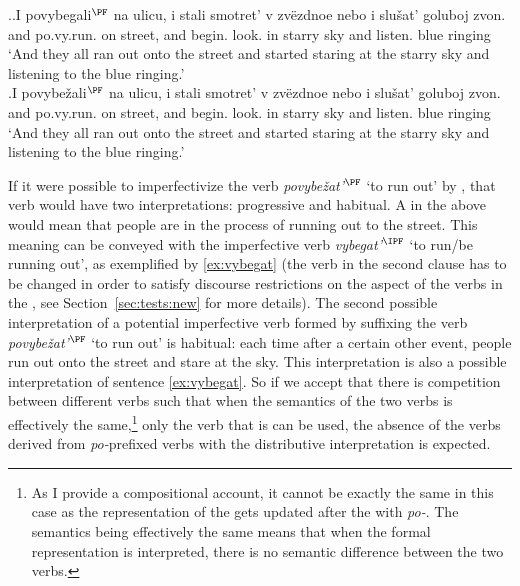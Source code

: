 \ex.\label{ex:povy}\ag.\label{ex:povybegat}I povybegali$^{\PF}$ na ulicu, i stali smotret' v zv\"{e}zdnoe nebo i slu\v{s}at' goluboj zvon.\\
and po.vy.run. on street, and begin. look. in starry sky and listen. blue ringing\\
\trans `And they all ran out onto the street and started staring at the starry sky and listening to the blue ringing.'\\
\bg.\label{ex:povybezhat}I povybe\v{z}ali$^{\PF}$ na ulicu, i stali smotret' v zv\"{e}zdnoe nebo i slu\v{s}at' goluboj zvon.\\
and po.vy.run. on street, and begin. look. in starry sky and listen. blue ringing\\
\trans `And they all ran out onto the street and started staring at the starry sky and listening to the blue ringing.'

If it were possible to imperfectivize the verb \textit{povybe\v{z}at'}$^{\PF}$ `to run out'  by , that  verb would have two interpretations: progressive and habitual. A  in the above  would mean that people are in the process of running out to the street. This meaning can be conveyed with the imperfective verb \textit{vybegat'}$^{\IPF}$ `to run/be running out', as exemplified by \ref{ex:vybegat} (the verb in the second clause has to be changed in order to satisfy discourse restrictions on the aspect of the verbs in the , see Section~\ref{sec:tests:new} for more details). The second possible interpretation of a potential imperfective verb formed by suffixing the verb \textit{povybe\v{z}at'}$^{\PF}$ `to run out' is habitual: each time after a certain other event, people run out onto the street and stare at the sky. This interpretation is also a possible interpretation of sentence \ref{ex:vybegat}. So if we accept that there is competition between different verbs such that when the semantics of the two verbs is effectively the same,\footnote{As I provide a compositional account, it cannot be exactly the same in this case as the representation of the  gets updated after the  with \textit{po-}. The semantics being effectively the same means that when the formal representation is interpreted, there is no semantic difference between the two verbs.} only the verb that is  can be used, the absence of the  verbs derived from \textit{po-}prefixed verbs with the distributive interpretation is expected.

